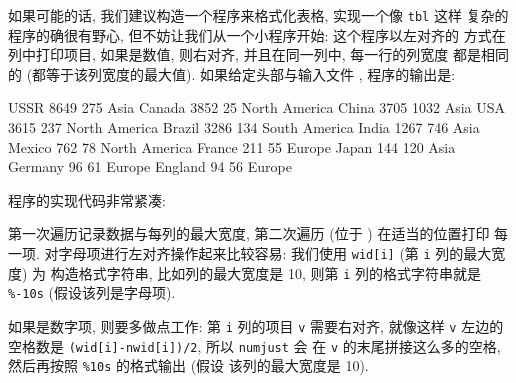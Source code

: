 如果可能的话, 我们建议构造一个程序来格式化表格, 实现一个像 \verb'tbl' 这样 
复杂的程序的确很有野心, 但不妨让我们从一个小程序开始: 这个程序以左对齐的
方式在列中打印项目, 如果是数值, 则右对齐, 并且在同一列中, 每一行的列宽度
都是相同的 (都等于该列宽度的最大值). 如果给定头部与输入文件
, 程序的输出是:
\begin{shell}
    USSR      8649    275   Asia         
    Canada    3852     25   North America
    China     3705   1032   Asia         
    USA       3615    237   North America
    Brazil    3286    134   South America
    India     1267    746   Asia         
    Mexico     762     78   North America
    France     211     55   Europe       
    Japan      144    120   Asia         
    Germany     96     61   Europe       
    England     94     56   Europe       
\end{shell}

程序的实现代码非常紧凑:
第一次遍历记录数据与每列的最大宽度, 第二次遍历 (位于 \END) 在适当的位置打印
每一项. 对字母项进行左对齐操作起来比较容易: 我们使用 \verb'wid[i]' (第 
\verb'i' 列的最大宽度) 为 \printf 构造格式字符串, 比如列的最大宽度是 10,
则第 \verb'i' 列的格式字符串就是 \verb'%-10s' (假设该列是字母项).

如果是数字项, 则要多做点工作: 第 \verb'i' 列的项目 \verb'v' 需要右对齐,
就像这样 
\verb'v' 左边的空格数是 \verb'(wid[i]-nwid[i])/2', 所以 \verb'numjust' 会
在 \verb'v' 的末尾拼接这么多的空格, 然后再按照 \verb'%10s' 的格式输出 (假设 
该列的最大宽度是 10).

